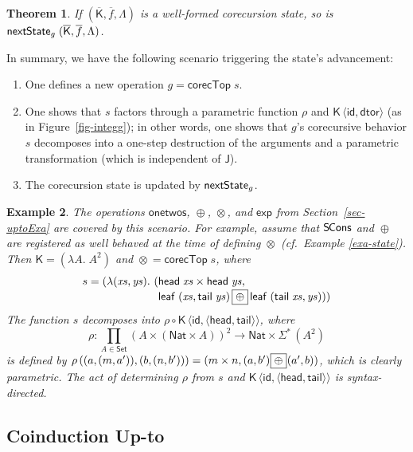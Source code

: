 \documentclass[preprint,draft]
{sigplanconf}
\newcommand\vthinspace{\kern.08333ex}
\newcommand\negvthinspace{\kern-.08333ex}
\newcommand\TC{\mathsf}
\newtheorem{theorem}{Theorem}
\newtheorem{eexample}[theorem]{Example}
\newcommand{\ov}{\overline}
\newcommand{\ra}{\rightarrow}
\newcommand{\<}{\langle}
\renewcommand{\>}{\rangle}
\renewcommand{\l}{\Lambda}
\renewcommand{\eta}{{{\mathsf{leaf}}}}
\newcommand{\dtor}{{{\mathsf{dtor}}}}
\newcommand{\nextState}{{{\mathsf{next\hspace*{-0.075ex}State}}}}
\newcommand{\onetwos}{{{\mathsf{onetwos}}}}
\newcommand\corecU{\mathsf{corecTop}}
\newcommand{\hd}{{{\mathsf{head}}}}
\newcommand{\tl}{{{\mathsf{tail}}}}
\newcommand{\SCons}{{{\mathsf{S\hspace*{-0.2ex}Cons}}}}
\newcommand{\opls}{\mathrel\oplus}
\newcommand{\oprd}{\mathrel\otimes}
\newcommand{\oexp}{{{\mathsf{exp}}}}
\newcommand{\id}{\mathsf{{id}}}
\newcommand{\J}{{\TC{J}}}
\renewcommand{\SS}{{\TC{\Sigma}}}
\newcommand{\K}{{\TC{K}}}
\newcommand{\xs}{{\mathit{xs}}}
\newcommand{\ys}{{\mathit{ys}}}
\newcommand\Set{\TC{Set}}
\newcommand\Nat{{\TC{Nat}}}
\newcommand\bb[1]{\fbox{$#1$}}
\def\S{Section~}
\begin{document}
\begin{theorem}\label{th-step}\rm
If $(\ov{\K},\ov{f},\l)$ is a well-formed corecursion state,
so is $\nextState_g\;(\ov{\K},\ov{f},\l)$.
\end{theorem}

In summary, we have the following scenario triggering the state's advancement:
\begin{enumerate}
\item One defines a new operation $g = \corecU\;s$.
\item One shows that $s$ factors through a parametric function $\rho$ and
$\K\,\langle\id, \dtor\rangle$ (as in Figure~\ref{fig-integg});
in other words, one shows that $g$'s corecursive behavior $s$ decomposes into a one-step
destruction
of the arguments and a parametric transformation (which is independent of $\J$).
\item The corecursion state is updated by $\nextState_{g}$.
\end{enumerate}


\begin{eexample}\rm \label{exa-integrate}
The operations $\onetwos$, $\opls$, $\oprd$, and $\oexp$ from \S\ref{sec-uptoExa}
are covered by this scenario.  For example,
assume that $\SCons$ and $\opls$ are registered as well behaved
at the time of defining $\oprd$ (cf.\ Example \ref{exa-state}).
Then $\K = (\lambda A.\;A^2)$ and
${\oprd} = \corecU\;s$, where
{
$$s = (\lambda (\xs,\ys).~(\!\begin{aligned}[t]
  & \hd\;\xs \times \hd\;\ys, \\[-\jot]
  & \eta\;(\xs,\tl\;\ys) \,\bb{\opls}\, \eta\;(\tl\;\xs,\ys)))\end{aligned}$$
}
The function $s$ decomposes into $\rho \mathrel\circ \K\,\langle\id,\langle \hd,\tl \rangle\rangle$, where
$$\textstyle\rho : \prod_{A \in \Set} (A \times (\Nat \times A))^2 \ra \Nat \times \SS^*\,(A^2)$$
is defined by
$\rho\,((a,\negvthinspace (m,\negvthinspace a')), (b,\negvthinspace (n,\negvthinspace b'))) = (m \times n, (a,\negvthinspace b') \vthinspace\bb{\opls}\vthinspace (a',\negvthinspace b))$,
which is clearly parametric.
The act of determining $\rho$ from
$s$ and $\K\,\langle\id,\langle \hd,\tl \rangle\rangle$
is syntax-directed.
\end{eexample}










\subsection{Coinduction Up-to}
\label{sec-coind}
\end{document}
